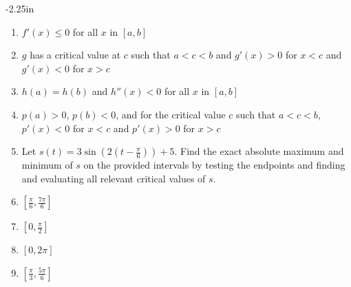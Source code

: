 \begin{adjustwidth*}{}{-2.25in}
\begin{multicols*}{2}
\begin{enumerate}[1),resume]
	\ba
		\item $f'(x) \le 0$ for all $x$ in $[a,b]$
		\item $g$ has a critical value at $c$ such that $a < c< b$ and $g'(x) > 0$ for $x < c$ and $g'(x) < 0$ for $x > c$
		\item $h(a) = h(b)$ and $h''(x) < 0$ for all $x$ in $[a,b]$
		\item $p(a) > 0$, $p(b) < 0$, and for the critical value $c$ such that $a < c < b$, $p'(x) < 0$ for $x < c$ and $p'(x) > 0$ for $x > c$
	\ea

	\item Let $s(t) = 3\sin(2(t-\frac{\pi}{6})) + 5.$  Find the exact absolute maximum and minimum of $s$ on the provided intervals by testing the endpoints and finding and evaluating all relevant critical values of $s$.
	\ba
		\item $[\frac{\pi}{6}, \frac{7\pi}{6}]$
		\item $[0, \frac{\pi}{2}]$
		\item $[0, 2\pi]$
		\item $[\frac{\pi}{3}, \frac{5\pi}{6}]$
	\ea	
\end{enumerate}

\end{multicols*}
\end{adjustwidth*}

